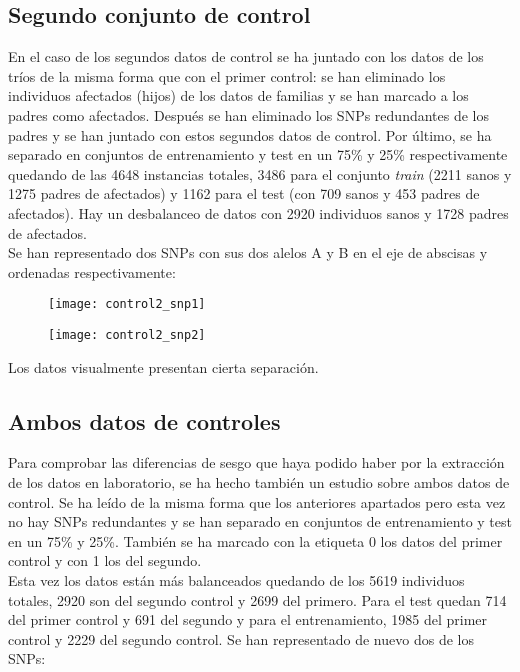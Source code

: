 \subsection{Segundo conjunto de control}
En el caso de los segundos datos de control se ha juntado con los datos de los tríos de la misma forma que con el primer control: se han eliminado los individuos afectados (hijos) de los datos de familias y se han marcado a los padres como afectados. Después se han eliminado los SNPs redundantes de los padres y se han juntado con estos segundos datos de control. Por último, se ha separado en conjuntos de entrenamiento y test en un 75\% y 25\% respectivamente quedando de las 4648 instancias totales, 3486 para el conjunto \textit{train} (2211 sanos y 1275 padres de afectados) y 1162 para el test (con 709 sanos y 453 padres de afectados). Hay un desbalanceo de datos con 2920 individuos sanos y 1728 padres de afectados.\\
Se han representado dos SNPs con sus dos alelos A y B en el eje de abscisas y ordenadas respectivamente:

\begin{figure}[H]
\centering
\begin{minipage}{.5\textwidth}
  \centering
  \texttt{[image: control2\_snp1]}
  \label{fig:snp1-control1}
\end{minipage}%
\begin{minipage}{.5\textwidth}
  \centering
  \texttt{[image: control2\_snp2]}
  \label{fig:snp2-control1}
\end{minipage}
\end{figure}

Los datos visualmente presentan cierta separación.

\subsection{Ambos datos de controles}
Para comprobar las diferencias de sesgo que haya podido haber por la extracción de los datos en laboratorio, se ha hecho también un estudio sobre ambos datos de control. Se ha leído de la misma forma que los anteriores apartados pero esta vez no hay SNPs redundantes y se han separado en conjuntos de entrenamiento y test en un 75\% y 25\%. También se ha marcado con la etiqueta 0 los datos del primer control y con 1 los del segundo.\\
Esta vez los datos están más balanceados quedando de los 5619 individuos totales, 2920 son del segundo control y 2699 del primero. Para el test quedan 714 del primer control y 691 del segundo y para el entrenamiento, 1985 del primer control y 2229 del segundo control. Se han representado de nuevo dos de los SNPs:

